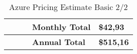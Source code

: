 \begin{landscape}
\begin{table}[]
\begin{tabularx}{\linewidth}{|l|X|X|X|X|}
                                        &                           &                 & \textbf{Monthly Total}                                                                                                                                                                                                                           & \textbf{\$42,93}                         \\ \hline
                                        &                           &                 & \textbf{Annual Total}                                                                                                                                                                                                                            & \textbf{\$515,16}                        \\ \hline
\end{tabularx}
\caption{Azure Pricing Estimate Basic 2/2}
\label{tab:azPriceT1_2}
\end{table}
\end{landscape}